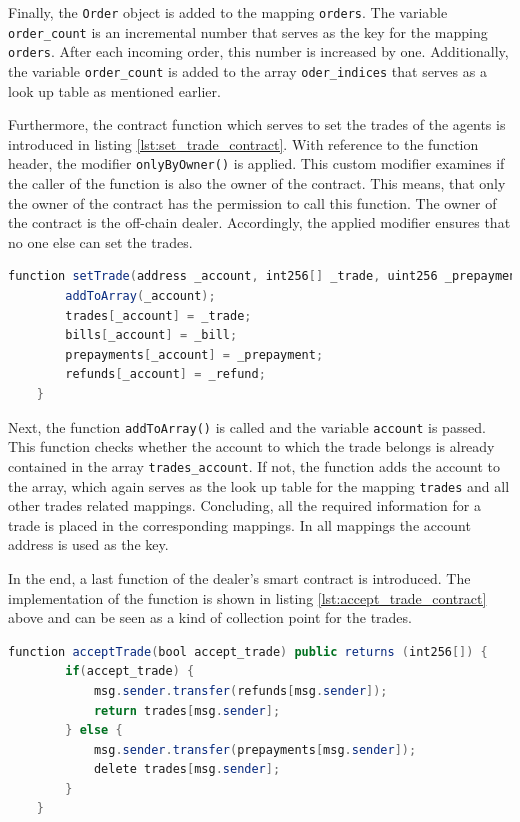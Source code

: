 Finally, the \verb|Order| object is added to the mapping \verb|orders|.
The variable \verb|order_count| is an incremental number that serves as the key for 
the mapping \verb|orders|. After each incoming order, this number is increased by one. 
Additionally, the variable \verb|order_count| is added to the array \verb|oder_indices|
that serves as a look up table as mentioned earlier.

Furthermore, the contract function which serves to set the trades of the agents is introduced in listing \ref{lst:set_trade_contract}.
With reference to the function header, the modifier \verb|onlyByOwner()| is applied.
This custom modifier examines if the caller of the function is also the owner of the contract. This means, that 
only the owner of the contract has the permission to call this function.
The owner of the contract is the off-chain dealer. Accordingly, the applied modifier ensures that no one else can set 
the trades. 

\begin{lstlisting}[float=htbp, label=lst:set_trade_contract, caption=Setting the trades, language=Java]
    function setTrade(address _account, int256[] _trade, uint256 _prepayment, uint256 _bill, uint256 _refund) public onlyByOwner() {
        addToArray(_account);
        trades[_account] = _trade;
        bills[_account] = _bill;
        prepayments[_account] = _prepayment;
        refunds[_account] = _refund;
    }
\end{lstlisting}

Next, the function \verb|addToArray()| is called and the variable \verb|account| is passed. 
This function checks whether the account to which the trade belongs is already contained in the array \verb|trades_account|.
If not, the function adds the account to the array, which again serves as the look up table for the
mapping \verb|trades| and all other trades related mappings.
Concluding, all the required information for a trade is placed in the corresponding mappings. In all
mappings the account address is used as the key.

In the end, a last function of the dealer's smart contract is introduced.
The implementation of the function is shown in listing \ref{lst:accept_trade_contract} above
and can be seen as a kind of collection point for the trades.

\begin{lstlisting}[float=htbp, label=lst:accept_trade_contract, caption=Collection point of trades, language=Java]
    function acceptTrade(bool accept_trade) public returns (int256[]) {
        if(accept_trade) {
            msg.sender.transfer(refunds[msg.sender]);
            return trades[msg.sender];
        } else {
            msg.sender.transfer(prepayments[msg.sender]);
            delete trades[msg.sender];
        }
    }
\end{lstlisting}

